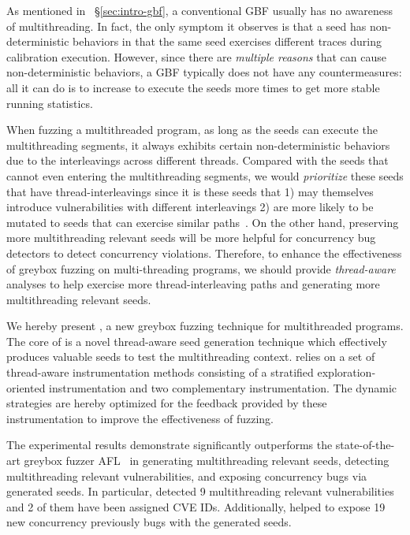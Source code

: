 As mentioned in ~\S\ref{sec:intro-gbf}, a conventional GBF usually has no awareness of multithreading.
In fact, the only symptom it observes is that a seed has non-deterministic behaviors in that the same seed exercises different traces during calibration execution.
However, since there are \emph{multiple reasons} that can cause non-deterministic behaviors, a GBF typically does not have any countermeasures: all it can do is to increase \Ncal to execute the seeds more times to get more stable running statistics.

When fuzzing a multithreaded program, as long as the seeds can execute the multithreading segments, it always exhibits certain non-deterministic behaviors due to the interleavings across different threads. Compared with the seeds that cannot even entering the multithreading segments, we would \emph{prioritize} these seeds that have thread-interleavings since it is these seeds that 1) may themselves introduce vulnerabilities with different interleavings 2) are more likely to be mutated to seeds that can exercise similar paths~\cite{fuzz_survey}. On the other hand, preserving more multithreading relevant seeds will be more helpful for concurrency bug detectors to detect concurrency violations. Therefore, to enhance the effectiveness of greybox fuzzing on multi-threading programs, we should provide \emph{thread-aware} analyses to help exercise more thread-interleaving paths and generating more multithreading relevant seeds.


We hereby present \mtfuzz, a new greybox fuzzing technique for multithreaded programs.
The core of \mtfuzz is a novel thread-aware seed generation technique which
effectively produces valuable seeds to test the multithreading context. 
\mtfuzz relies on a set of thread-aware instrumentation methods consisting of a
stratified exploration-oriented instrumentation and two complementary instrumentation. The dynamic strategies are hereby optimized for the feedback provided by these instrumentation to improve the effectiveness of fuzzing.

The experimental results demonstrate \mtfuzz significantly outperforms the state-of-the-art greybox fuzzer AFL~\cite{afl} in generating multithreading relevant seeds, detecting multithreading relevant vulnerabilities, and exposing concurrency bugs via generated seeds. In particular, \mtfuzz detected 9 multithreading relevant vulnerabilities and 2 of them have been assigned CVE IDs. Additionally, \mtfuzz helped to expose 19 new concurrency previously bugs with the generated seeds. 

